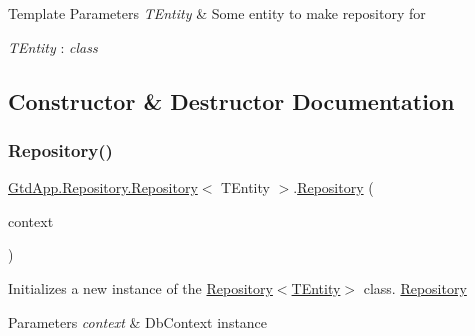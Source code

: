 \begin{DoxyTemplParams}{Template Parameters}
{\em T\+Entity} & Some entity to make repository for\\
\hline
\end{DoxyTemplParams}
\begin{Desc}
\item[Type Constraints]\begin{description}
\item[{\em T\+Entity} : {\em class}]\end{description}
\end{Desc}


\subsection{Constructor \& Destructor Documentation}
\mbox{\label{class_gtd_app_1_1_repository_1_1_repository_a7f85fc7e6c3c85b561ac9d31859c9ed5}} 
\subsubsection{\texorpdfstring{Repository()}{Repository()}}
{\footnotesize\ttfamily \mbox{\hyperlink{class_gtd_app_1_1_repository_1_1_repository}{Gtd\+App.\+Repository.\+Repository}}$<$ T\+Entity $>$.\mbox{\hyperlink{class_gtd_app_1_1_repository_1_1_repository}{Repository}} (\begin{DoxyParamCaption}\item[{\mbox{\hyperlink{class_gtd_app_1_1_data_1_1_gtd_entity_data_model}{Gtd\+Entity\+Data\+Model}}}]{context }\end{DoxyParamCaption})}



Initializes a new instance of the \mbox{\hyperlink{class_gtd_app_1_1_repository_1_1_repository_a7f85fc7e6c3c85b561ac9d31859c9ed5}{Repository$<$\+T\+Entity$>$}} class. \mbox{\hyperlink{class_gtd_app_1_1_repository_1_1_repository}{Repository}} 


\begin{DoxyParams}{Parameters}
{\em context} & Db\+Context instance\\
\hline
\end{DoxyParams}



